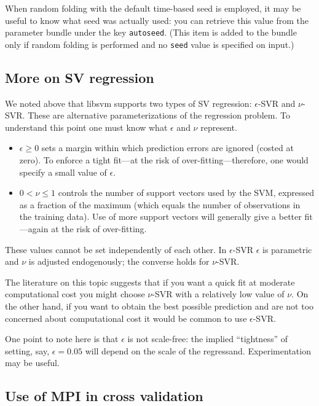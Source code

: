 \documentclass{article}
\begin{document}
When random folding with the default time-based seed is employed, it
may be useful to know what seed was actually used: you can retrieve
this value from the parameter bundle under the key
\texttt{autoseed}. (This item is added to the bundle only if random
folding is performed and no \texttt{seed} value is specified on
input.)

\subsection{More on SV regression}
\label{sec:svr}

We noted above that libsvm supports two types of SV regression:
$\epsilon$-SVR and $\nu$-SVR. These are alternative parameterizations
of the regression problem. To understand this point one must know what
$\epsilon$ and $\nu$ represent.
\begin{itemize}
\item $\epsilon \geq 0$ sets a margin within which prediction errors
  are ignored (costed at zero). To enforce a tight fit---at the risk
  of over-fitting---therefore, one would specify a small value of
  $\epsilon$.
\item $0 < \nu \leq 1$ controls the number of support vectors used by
  the SVM, expressed as a fraction of the maximum (which equals the
  number of observations in the training data). Use of more support
  vectors will generally give a better fit---again at the risk of
  over-fitting.
\end{itemize}
These values cannot be set independently of each other. In
$\epsilon$-SVR $\epsilon$ is parametric and $\nu$ is adjusted
endogenously; the converse holds for $\nu$-SVR.

The literature on this topic suggests that if you want a quick fit at
moderate computational cost you might choose $\nu$-SVR with a
relatively low value of $\nu$. On the other hand, if you want to
obtain the best possible prediction and are not too concerned about
computational cost it would be common to use $\epsilon$-SVR.

One point to note here is that $\epsilon$ is not scale-free: the
implied ``tightness'' of setting, say, $\epsilon = 0.05$ will depend
on the scale of the regressand. Experimentation may be useful.

\subsection{Use of MPI in cross validation}
\label{sec:mpi}
\end{document}
